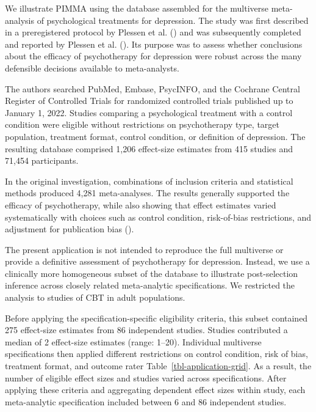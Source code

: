 \documentclass[
  man,
  longtable,
  nolmodern,
  notxfonts,
  notimes,
  colorlinks=true,linkcolor=blue,citecolor=blue,urlcolor=blue]{apa7}
\begin{document}
We illustrate PIMMA using the database assembled for the multiverse
meta-analysis of psychological treatments for depression. The study was
first described in a preregistered protocol by Plessen et al.
() and was subsequently completed and
reported by Plessen et al. (). Its
purpose was to assess whether conclusions about the efficacy of
psychotherapy for depression were robust across the many defensible
decisions available to meta-analysts.

The authors searched PubMed, Embase, PsycINFO, and the Cochrane Central
Register of Controlled Trials for randomized controlled trials published
up to January 1, 2022. Studies comparing a psychological treatment with
a control condition were eligible without restrictions on psychotherapy
type, target population, treatment format, control condition, or
definition of depression. The resulting database comprised 1,206
effect-size estimates from 415 studies and 71,454 participants.

In the original investigation, combinations of inclusion criteria and
statistical methods produced 4,281 meta-analyses. The results generally
supported the efficacy of psychotherapy, while also showing that effect
estimates varied systematically with choices such as control condition,
risk-of-bias restrictions, and adjustment for publication bias
().

The present application is not intended to reproduce the full multiverse
or provide a definitive assessment of psychotherapy for depression.
Instead, we use a clinically more homogeneous subset of the database to
illustrate post-selection inference across closely related meta-analytic
specifications. We restricted the analysis to studies of CBT in adult
populations.

Before applying the specification-specific eligibility criteria, this
subset contained 275 effect-size estimates from 86 independent studies.
Studies contributed a median of 2 effect-size estimates (range: 1--20).
Individual multiverse specifications then applied different restrictions
on control condition, risk of bias, treatment format, and outcome rater
Table~\ref{tbl-application-grid}. As a result, the number of eligible
effect sizes and studies varied across specifications. After applying
these criteria and aggregating dependent effect sizes within study, each
meta-analytic specification included between 6 and 86 independent
studies.
\end{document}
